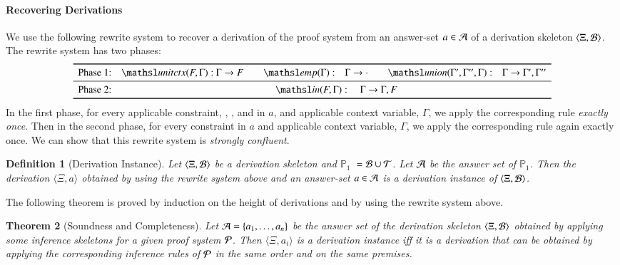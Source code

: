 \documentclass{new_tlp}
\newcommand{\elin}[2]{\ensuremath{{\tsl{unitctx}(\ensuremath{#1}, \ensuremath{#2})}}}
\newcommand{\emp}[1]{\ensuremath{{\tsl{emp}(\ensuremath{#1})}}}
\newcommand{\union}[3]{\ensuremath{{\tsl{union}(\ensuremath{#1},\ensuremath{#2},\ensuremath{ #3})}}}
\newcommand{\In}[2]{\ensuremath{\tsl{in}(\ensuremath{#1},\ensuremath{#2})}}
\newcommand\LPder{\ensuremath{\mathbb{P}_1}}
\newtheorem{theorem}{Theorem}
\newtheorem{definition}[theorem]{Definition}
\begin{document}
\paragraph{Recovering Derivations } 
We use the following rewrite system to recover a derivation of the proof system from an answer-set $a \in
\Ascr$ of a derivation skeleton $\tup{\Xi, \Bscr}$. The rewrite system has two phases:
\[
\begin{array}{l@{\quad}r@{~}l@{\quad}@{\quad}r@{\quad}l@{\qquad}r@{\quad}l}
\toprule
{\textrm{Phase 1:}} 
& \elin{F}{\Gamma}:  & \Gamma \rightarrow F 
& \emp{\Gamma}: & \Gamma \rightarrow \cdot 
& \union{\Gamma'}{\Gamma''}{\Gamma}: & \Gamma \rightarrow \Gamma',
\Gamma''\\
\midrule
\textrm{Phase 2:} & \multicolumn{6}{c}{
\In{F}{\Gamma}: \quad \Gamma \rightarrow \Gamma, F
}\\
\bottomrule
\end{array}
\]
In the first phase, for every applicable constraint, 
, , and  in $a$, and applicable context
variable, $\Gamma$, we apply the corresponding rule \emph{exactly once}. 
Then in the second phase, for every  constraint in $a$ and
applicable context variable, $\Gamma$, we apply the
corresponding rule again exactly once. 
We can show that this rewrite system is \emph{strongly confluent}.
%
\begin{definition}[Derivation Instance]
Let $\langle \Xi, \Bscr \rangle$ be a derivation skeleton and \LPder\ $= \Bscr
\cup \Tscr$. Let $\Ascr$ be the answer set
of \LPder. Then the derivation $\langle \Xi, a \rangle$ obtained by using the rewrite system above and an answer-set 
$a \in \Ascr$ is a \emph{derivation instance} of $\langle \Xi, \Bscr \rangle$.
\end{definition}

The following theorem is proved by induction on the height of derivations and 
by using  the rewrite system above.

\begin{theorem}[Soundness and Completeness]
Let $\Ascr = \{a_1, \ldots, a_n \}$ be the answer set of the derivation skeleton $\tup{\Xi, \Bscr}$ obtained
by applying some inference skeletons for a given proof system $\Pscr$. 
Then $\langle \Xi, a_i \rangle$ is a derivation instance iff it is a derivation
that can be obtained by applying the corresponding inference rules of $\Pscr$ in
the same order and on the same premises.
%
\end{theorem}
 
\end{document}
